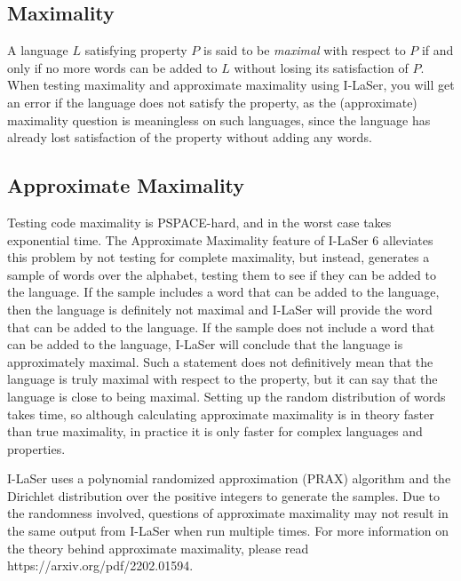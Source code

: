\documentclass{article}
\begin{document}
\subsection{Maximality}
\par A language $L$ satisfying property $P$ is said to be \textit{maximal} with respect to $P$ if and only if no more words can be added to $L$ without losing its satisfaction of $P$. When testing maximality and approximate maximality using I-LaSer, you will get an error if the language does not satisfy the property, as the (approximate) maximality question is meaningless on such languages, since the language has already lost satisfaction of the property without adding any words. 

\subsection{Approximate Maximality}
\par Testing code maximality is PSPACE-hard, and in the worst case takes exponential time.
The Approximate Maximality feature of I-LaSer 6 alleviates this problem by not testing for complete maximality, but instead, generates a sample of words over the alphabet, testing them to see if they can be added to the language.
If the sample includes a word that can be added to the language, then the language is definitely not maximal and I-LaSer will provide the word that can be added to the language.
If the sample does not include a word that can be added to the language, I-LaSer will conclude that the language is approximately maximal.
Such a statement does not definitively mean that the language is truly maximal with respect to the property, but it can say that the language is close to being maximal.
Setting up the random distribution of words takes time, so although calculating approximate maximality is in theory faster than true maximality, in practice it is only faster for complex languages and properties. 

\par I-LaSer uses a polynomial randomized approximation (PRAX) algorithm and the Dirichlet distribution over the positive integers to generate the samples. Due to the randomness involved, questions of approximate maximality may not result in the same output from I-LaSer when run multiple times. For more information on the theory behind approximate maximality, please read https://arxiv.org/pdf/2202.01594. 

\end{document}
